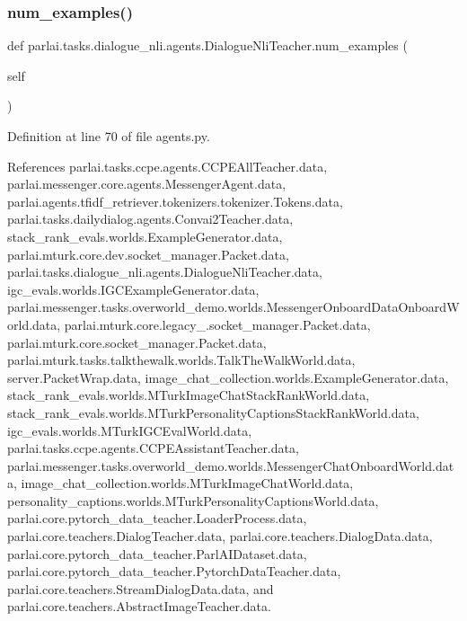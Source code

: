 \subsubsection{\texorpdfstring{num\+\_\+examples()}{num\_examples()}}
{\footnotesize\ttfamily def parlai.\+tasks.\+dialogue\+\_\+nli.\+agents.\+Dialogue\+Nli\+Teacher.\+num\+\_\+examples (\begin{DoxyParamCaption}\item[{}]{self }\end{DoxyParamCaption})}



Definition at line 70 of file agents.\+py.



References parlai.\+tasks.\+ccpe.\+agents.\+C\+C\+P\+E\+All\+Teacher.\+data, parlai.\+messenger.\+core.\+agents.\+Messenger\+Agent.\+data, parlai.\+agents.\+tfidf\+\_\+retriever.\+tokenizers.\+tokenizer.\+Tokens.\+data, parlai.\+tasks.\+dailydialog.\+agents.\+Convai2\+Teacher.\+data, stack\+\_\+rank\+\_\+evals.\+worlds.\+Example\+Generator.\+data, parlai.\+mturk.\+core.\+dev.\+socket\+\_\+manager.\+Packet.\+data, parlai.\+tasks.\+dialogue\+\_\+nli.\+agents.\+Dialogue\+Nli\+Teacher.\+data, igc\+\_\+evals.\+worlds.\+I\+G\+C\+Example\+Generator.\+data, parlai.\+messenger.\+tasks.\+overworld\+\_\+demo.\+worlds.\+Messenger\+Onboard\+Data\+Onboard\+World.\+data, parlai.\+mturk.\+core.\+legacy\+\_.\+socket\+\_\+manager.\+Packet.\+data, parlai.\+mturk.\+core.\+socket\+\_\+manager.\+Packet.\+data, parlai.\+mturk.\+tasks.\+talkthewalk.\+worlds.\+Talk\+The\+Walk\+World.\+data, server.\+Packet\+Wrap.\+data, image\+\_\+chat\+\_\+collection.\+worlds.\+Example\+Generator.\+data, stack\+\_\+rank\+\_\+evals.\+worlds.\+M\+Turk\+Image\+Chat\+Stack\+Rank\+World.\+data, stack\+\_\+rank\+\_\+evals.\+worlds.\+M\+Turk\+Personality\+Captions\+Stack\+Rank\+World.\+data, igc\+\_\+evals.\+worlds.\+M\+Turk\+I\+G\+C\+Eval\+World.\+data, parlai.\+tasks.\+ccpe.\+agents.\+C\+C\+P\+E\+Assistant\+Teacher.\+data, parlai.\+messenger.\+tasks.\+overworld\+\_\+demo.\+worlds.\+Messenger\+Chat\+Onboard\+World.\+data, image\+\_\+chat\+\_\+collection.\+worlds.\+M\+Turk\+Image\+Chat\+World.\+data, personality\+\_\+captions.\+worlds.\+M\+Turk\+Personality\+Captions\+World.\+data, parlai.\+core.\+pytorch\+\_\+data\+\_\+teacher.\+Loader\+Process.\+data, parlai.\+core.\+teachers.\+Dialog\+Teacher.\+data, parlai.\+core.\+teachers.\+Dialog\+Data.\+data, parlai.\+core.\+pytorch\+\_\+data\+\_\+teacher.\+Parl\+A\+I\+Dataset.\+data, parlai.\+core.\+pytorch\+\_\+data\+\_\+teacher.\+Pytorch\+Data\+Teacher.\+data, parlai.\+core.\+teachers.\+Stream\+Dialog\+Data.\+data, and parlai.\+core.\+teachers.\+Abstract\+Image\+Teacher.\+data.



